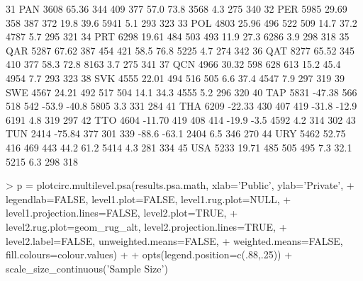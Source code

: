 \documentclass[nojss]{jss}
\begin{document}
\begin{Schunk}
\begin{Soutput}
31    PAN  3608   65.36 344 409  377   57.0   73.8  3568    4.3   275   340
32    PER  5985   29.69 358 387  372   19.8   39.6  5941    5.1   293   323
33    POL  4803   25.96 496 522  509   14.7   37.2  4787    5.7   295   321
34    PRT  6298   19.61 484 503  493   11.9   27.3  6286    3.9   298   318
35    QAR  5287   67.62 387 454  421   58.5   76.8  5225    4.7   274   342
36    QAT  8277   65.52 345 410  377   58.3   72.8  8163    3.7   275   341
37    QCN  4966   30.32 598 628  613   15.2   45.4  4954    7.7   293   323
38    SVK  4555   22.01 494 516  505    6.6   37.4  4547    7.9   297   319
39    SWE  4567   24.21 492 517  504   14.1   34.3  4555    5.2   296   320
40    TAP  5831  -47.38 566 518  542  -53.9  -40.8  5805    3.3   331   284
41    THA  6209  -22.33 430 407  419  -31.8  -12.9  6191    4.8   319   297
42    TTO  4604  -11.70 419 408  414  -19.9   -3.5  4592    4.2   314   302
43    TUN  2414  -75.84 377 301  339  -88.6  -63.1  2404    6.5   346   270
44    URY  5462   52.75 416 469  443   44.2   61.2  5414    4.3   281   334
45    USA  5233   19.71 485 505  495    7.3   32.1  5215    6.3   298   318
\end{Soutput}
\end{Schunk}

\begin{Schunk}
\begin{Sinput}
> p = plotcirc.multilevel.psa(results.psa.math, xlab='Public', ylab='Private', 
+ legendlab=FALSE, level1.plot=FALSE, level1.rug.plot=NULL, 
+ level1.projection.lines=FALSE, level2.plot=TRUE, 
+ level2.rug.plot=geom_rug_alt, level2.projection.lines=TRUE, 
+ level2.label=FALSE, unweighted.means=FALSE, 
+ weighted.means=FALSE, fill.colours=colour.values) + 
+ opts(legend.position=c(.88,.25)) +  scale_size_continuous('Sample Size')
\end{Sinput}
\end{Schunk}
\end{document}
